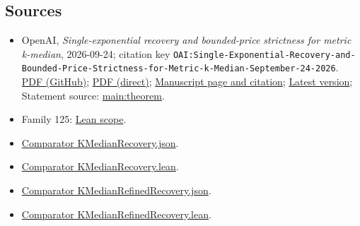 \documentclass[11pt]{article}
\begin{document}
\subsection{Sources}
\begin{itemize}
\item OpenAI, \emph{Single-exponential recovery and bounded-price strictness for metric k-median}, 2026-09-24; citation key \texttt{OAI:Single-Exponential-Recovery-and-Bounded-Price-Strictness-for-Metric-k-Median-September-24-2026}. \href{https://github.com/openai/math/blob/adc7f1241b42e322a6451854ab7e4b4c146bf78a/preprints/Single-Exponential-Recovery-and-Bounded-Price-Strictness-for-Metric-k-Median-September-24-2026/paper.pdf}{PDF (GitHub)}; \href{https://github.com/openai/math/raw/adc7f1241b42e322a6451854ab7e4b4c146bf78a/preprints/Single-Exponential-Recovery-and-Bounded-Price-Strictness-for-Metric-k-Median-September-24-2026/paper.pdf}{PDF (direct)}; \href{https://github.com/openai/math/blob/adc7f1241b42e322a6451854ab7e4b4c146bf78a/preprints/Single-Exponential-Recovery-and-Bounded-Price-Strictness-for-Metric-k-Median-September-24-2026/README.md}{Manuscript page and citation}; \href{https://github.com/openai/math/blob/main/preprints/Single-Exponential-Recovery-and-Bounded-Price-Strictness-for-Metric-k-Median-September-24-2026/paper.pdf}{Latest version}; Statement source: \href{https://github.com/openai/math/blob/adc7f1241b42e322a6451854ab7e4b4c146bf78a/preprints/Single-Exponential-Recovery-and-Bounded-Price-Strictness-for-Metric-k-Median-September-24-2026/build/sections/introduction.tex\#L142}{main:theorem}.
\item Family 125: \href{https://github.com/openai/math/blob/adc7f1241b42e322a6451854ab7e4b4c146bf78a/lean/docs/125.md}{Lean scope}.
\item \href{https://github.com/openai/math/blob/adc7f1241b42e322a6451854ab7e4b4c146bf78a/lean/ComparatorChallenges/KMedianRecovery.json}{Comparator KMedianRecovery.json}.
\item \href{https://github.com/openai/math/blob/adc7f1241b42e322a6451854ab7e4b4c146bf78a/lean/ComparatorChallenges/KMedianRecovery.lean}{Comparator KMedianRecovery.lean}.
\item \href{https://github.com/openai/math/blob/adc7f1241b42e322a6451854ab7e4b4c146bf78a/lean/ComparatorChallenges/KMedianRefinedRecovery.json}{Comparator KMedianRefinedRecovery.json}.
\item \href{https://github.com/openai/math/blob/adc7f1241b42e322a6451854ab7e4b4c146bf78a/lean/ComparatorChallenges/KMedianRefinedRecovery.lean}{Comparator KMedianRefinedRecovery.lean}.

\end{itemize}
\end{document}

